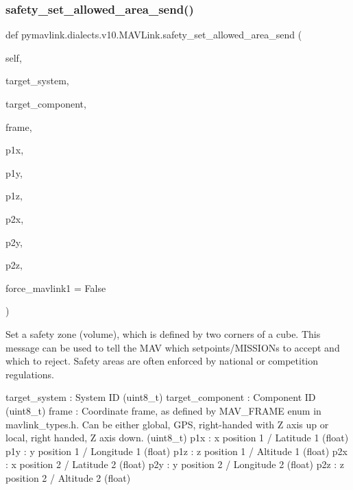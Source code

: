 \begin{DoxyVerb}
\begin{DoxyVerb}
\begin{DoxyVerb}
\begin{DoxyVerb}
\begin{DoxyVerb}
\begin{DoxyVerb}
\begin{DoxyVerb}
\begin{DoxyVerb}
\begin{DoxyVerb}
\begin{DoxyVerb}
\subsubsection{\texorpdfstring{safety\+\_\+set\+\_\+allowed\+\_\+area\+\_\+send()}{safety\_set\_allowed\_area\_send()}}
{\footnotesize\ttfamily def pymavlink.\+dialects.\+v10.\+M\+A\+V\+Link.\+safety\+\_\+set\+\_\+allowed\+\_\+area\+\_\+send (\begin{DoxyParamCaption}\item[{}]{self,  }\item[{}]{target\+\_\+system,  }\item[{}]{target\+\_\+component,  }\item[{}]{frame,  }\item[{}]{p1x,  }\item[{}]{p1y,  }\item[{}]{p1z,  }\item[{}]{p2x,  }\item[{}]{p2y,  }\item[{}]{p2z,  }\item[{}]{force\+\_\+mavlink1 = {\ttfamily False} }\end{DoxyParamCaption})}

\begin{DoxyVerb}Set a safety zone (volume), which is defined by two corners of a cube.
This message can be used to tell the MAV which
setpoints/MISSIONs to accept and which to reject.
Safety areas are often enforced by national or
competition regulations.

target_system             : System ID (uint8_t)
target_component          : Component ID (uint8_t)
frame                     : Coordinate frame, as defined by MAV_FRAME enum in mavlink_types.h. Can be either global, GPS, right-handed with Z axis up or local, right handed, Z axis down. (uint8_t)
p1x                       : x position 1 / Latitude 1 (float)
p1y                       : y position 1 / Longitude 1 (float)
p1z                       : z position 1 / Altitude 1 (float)
p2x                       : x position 2 / Latitude 2 (float)
p2y                       : y position 2 / Longitude 2 (float)
p2z                       : z position 2 / Altitude 2 (float)\end{DoxyVerb}
 \mbox{\label{classpymavlink_1_1dialects_1_1v10_1_1MAVLink_ad540f221c03a5a6a7fff58f04c8d455c}} 

\end{DoxyVerb}
\end{DoxyVerb}
\end{DoxyVerb}
\end{DoxyVerb}
\end{DoxyVerb}
\end{DoxyVerb}
\end{DoxyVerb}
\end{DoxyVerb}
\end{DoxyVerb}
\end{DoxyVerb}

